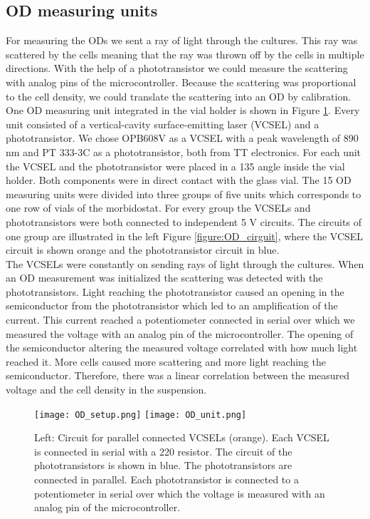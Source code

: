 \subsection{OD measuring units}
For measuring the ODs we sent a ray of light through the cultures. This ray was scattered by the cells meaning that the ray was thrown off by the cells in multiple directions. With the help of a phototransistor we could measure the scattering with analog pins of the microcontroller. Because the scattering was proportional to the cell density, we could translate the scattering into an OD by calibration. \\
One OD measuring unit integrated in the vial holder is shown in Figure \ref{figure:OD_unit}. Every unit consisted of a vertical-cavity surface-emitting laser (VCSEL) and a phototransistor. We chose OPB608V as a VCSEL with a peak wavelength of 890 nm and PT 333-3C as a phototransistor, both from TT electronics. For each unit the VCSEL and the phototransistor were placed in a 135 \degree \space angle inside the vial holder. Both components were in direct contact with the glass vial.
The 15 OD measuring units were divided into three groups of five units which corresponds to one row of vials of the morbidostat. For every group the VCSELs and phototransistors were both connected to independent 5 V circuits. The circuits of one group are illustrated in the left Figure \ref{figure:OD_cirguit}, where the VCSEL circuit is shown orange and the phototransistor circuit in blue. \\
The VCSELs were constantly on sending rays of light through the cultures. When an OD measurement was initialized the scattering was detected with the phototransistors. Light reaching the phototransistor caused an opening in the semiconductor from the phototransistor which led to an amplification of the current. This current reached a potentiometer connected in serial over which we measured the voltage with an analog pin of the microcontroller. The opening of the semiconductor altering the measured voltage correlated with how much light reached it. More cells caused more scattering and more light reaching the semiconductor. Therefore, there was a linear correlation between the measured voltage and the cell density in the suspension. \\

\label{section:OD}
\begin{figure}
	\texttt{[image: OD\_setup.png]}
	\texttt{[image: OD\_unit.png]}
	\caption{Left: Circuit for parallel connected VCSELs (orange). Each VCSEL is connected in serial with a 220 \textOmega \space resistor. The circuit of the phototransistors is shown in blue. The phototransistors are connected in parallel. Each phototransistor is connected to a potentiometer in serial over which the voltage is measured with an analog pin of the microcontroller.}
	\label{figure:OD_cirguit}
	\label{figure:OD_unit}
\end{figure}

